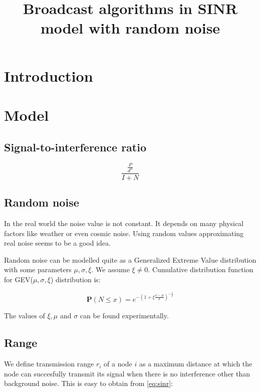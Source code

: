 \documentclass[a4paper,12pt]{report}
\title{Broadcast algorithms in SINR model with random noise}
\begin{document}
\maketitle

\chapter{Introduction}

\chapter{Model}

\section{Signal-to-interference ratio}

\begin{equation}
\label{eq:sinr}
\frac{\frac{P}{d^\alpha}}{I + N}
\end{equation}

\section{Random noise}

In the real world the noise value is not constant. It depends on many physical factors like weather or even cosmic noise. Using random values approximating real noise seems to be a good idea.

Random noise can be modelled quite as a Generalized Extreme Value  \cite{gev} distribution with some parameters $\mu, \sigma, \xi$. We assume $\xi \neq 0$. Cumulative distribution function for GEV($\mu, \sigma, \xi$) distribution is:

\begin{equation}
\label{eq:gev_cdf}
\textbf{P}(N \leq x) = e^{-(1 + \xi \frac{x - \mu}{\sigma}) ^ {-\frac{1}{\xi}}}
\end{equation}

The values of $\xi, \mu$ and $\sigma$ can be found experimentally.

\section{Range}

We define transmission range $r_i$ of a node $i$ as a maximum distance at which the node can succesfully transmit its signal when there is no interference other than background noise. This is easy to obtain from \eqref{eq:sinr}:
\end{document}
